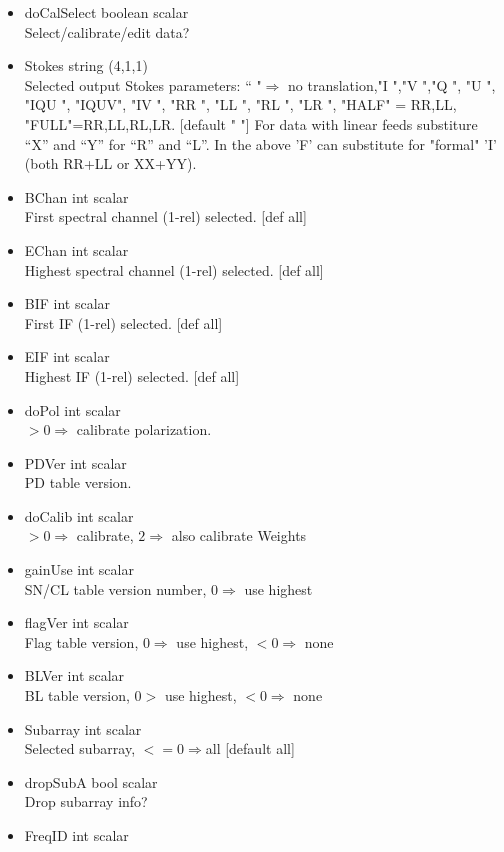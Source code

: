 \documentclass[11pt]{report}
\begin{document}
\begin{itemize}
\item  doCalSelect boolean scalar\\
Select/calibrate/edit data?
\item  Stokes string (4,1,1) \\
Selected output Stokes parameters:
``    "$\Rightarrow$ no translation,"I   ","V   ","Q   ", "U   ", 
"IQU ", "IQUV",  "IV  ", "RR  ", "LL  ", "RL  ", "LR  ", 
"HALF" = RR,LL, "FULL"=RR,LL,RL,LR. [default "    "]
For data with linear feeds substiture ``X'' and ``Y'' for ``R'' and ``L''.
In the above 'F' can substitute for "formal" 'I' (both RR+LL or XX+YY).
\item  BChan int scalar \\ 
First spectral channel (1-rel) selected. [def all]
\item  EChan int scalar \\ 
Highest spectral channel (1-rel) selected. [def all]
\item  BIF   int scalar \\ 
First IF (1-rel) selected. [def all]
\item  EIF   int scalar \\ 
Highest IF (1-rel) selected. [def all]
\item  doPol   int scalar \\ 
$>0 \Rightarrow$ calibrate polarization.
\item  PDVer   int scalar \\ 
PD table version.
\item  doCalib int scalar \\ 
$>0 \Rightarrow$ calibrate, $2 \Rightarrow$ also calibrate Weights
\item  gainUse int scalar \\ 
SN/CL table version number, $0 \Rightarrow$ use highest
\item  flagVer int scalar \\ 
Flag table version, $0 \Rightarrow$ use highest, $<0 \Rightarrow$ none
\item  BLVer   int scalar \\ 
BL table version, $0>$ use highest, $<0 \Rightarrow$ none
\item  Subarray int scalar \\ 
Selected subarray, $<=0 \Rightarrow$all [default all]
\item  dropSubA bool scalar \\ 
Drop subarray info?
\item  FreqID   int scalar \\ 

\end{itemize}
\end{document}

